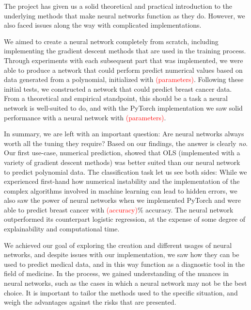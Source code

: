 The project has given us a solid theoretical and practical introduction to the underlying methods that make neural networks function as they do. However, we also faced issues along the way with complicated implementations.

We aimed to create a neural network completely from scratch, including implementing the gradient descent methods that are used in the training process. Through experiments with each subsequent part that was implemented, we were able to produce a network that could perform predict numerical values based on data generated from a polynomial, initialized with \textcolor{red}{(parameters)}. Following these initial tests, we constructed a network that could predict breast cancer data. From a theoretical and empirical standpoint, this should be a task a neural network is well-suited to do, and with the PyTorch implementation we saw solid performance with a neural network with \textcolor{red}{(parameters)}.

In summary, we are left with an important question: Are neural networks always worth all the tuning they require? Based on our findings, the answer is clearly \emph{no}. Our first use-case, numerical prediction, showed that OLS (implemented with a variety of gradient descent methods) was better suited than our neural network to predict polynomial data. The classification task let us see both sides: While we experienced first-hand how numerical instability and the implementation of the complex algorithms involved in machine learning can lead to hidden errors, we also saw the power of neural networks when we implemented PyTorch and were able to predict breast cancer with \textcolor{red}{(accuracy)}\% accuracy. The neural network outperformed its counterpart logistic regression, at the expense of some degree of explainability and computational time. 

We achieved our goal of exploring the creation and different usages of neural networks, and despite issues with our implementation, we saw how they can be used to predict medical data, and in this way function as a diagnostic tool in the field of medicine. In the process, we gained understanding of the nuances in neural networks, such as the cases in which a neural network may not be the best choice. It is important to tailor the methods used to the specific situation, and weigh the advantages against the risks that are presented.